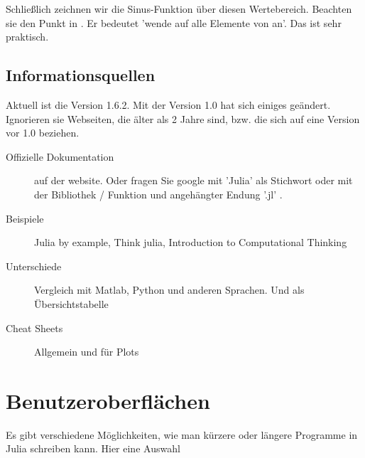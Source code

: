 Schließlich zeichnen wir die Sinus-Funktion über diesen Wertebereich. Beachten sie den Punkt in . Er bedeutet 'wende  auf alle Elemente von  an'. Das ist sehr praktisch.


\subsection{Informationsquellen}

Aktuell ist die Version 1.6.2. Mit der Version 1.0 hat sich einiges geändert. Ignorieren sie Webseiten, die älter als 2 Jahre sind, bzw. die sich auf eine Version vor 1.0 beziehen.

\begin{description}

\item[Offizielle Dokumentation] auf der website. Oder fragen Sie google mit 'Julia' als Stichwort oder mit der Bibliothek / Funktion und angehängter Endung '.jl' .

\item[Beispiele] Julia by example, Think julia, Introduction to Computational Thinking

\item[Unterschiede] Vergleich  mit  Matlab,  Python und anderen Sprachen. Und als Übersichtstabelle

\item[Cheat Sheets] Allgemein und für Plots 

\end{description}



\section{Benutzeroberflächen}


Es gibt verschiedene Möglichkeiten, wie man kürzere oder längere Programme in Julia schreiben kann. Hier eine Auswahl

